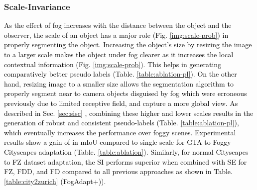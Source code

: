 \documentclass[final,5p,times,twocolumn]{elsarticle}
\begin{document}
\subsubsection{Scale-Invariance}
\textcolor{black}{
As the effect of fog increases with the distance between the object and the observer, the scale of an object has a major role (Fig. \ref{img:scale-prob}) in properly segmenting the object. 
\textcolor{black}{Increasing the object's size by resizing the image to a larger scale makes the object under fog clearer as it increases the local contextual information (Fig. \ref{img:scale-prob}). }
This helps in generating comparatively better pseudo labels (Table. \ref{table:ablation-pl}).  
On the other hand, resizing image to a smaller size allows the segmentation algorithm to properly segment near to camera objects disguised by fog which were erroneous previously due to limited receptive field, and capture a more global view. 
\textcolor{black}{As described in Sec. \ref{sec:sisc} , combining these higher and lower scales results in the generation of robust and consistent pseudo-labels (Table. \ref{table:ablation-pl}), which eventually increases the performance over foggy scenes.}
Experimental results show a gain of  in mIoU compared to single scale for GTA to Foggy-Cityscapes adaptation (Table. \ref{table:ablation}). Similarly, for normal Cityscapes to FZ dataset adaptation, the SI performs superior when combined with SE for FZ, FDD, and FD compared to all previous approaches as shown in Table. \ref{table:city2zurich} (FogAdapt+)).
}

\begin{table}[H]
\footnotesize
\centering
\caption{Effect of incorporating uncertainty weighted scale invariance on the quality of pseudo-labels. Here wSI is Weighted Scale-Invariance.}
\label{table:ablation-pl}
\end{table}
\end{document}
